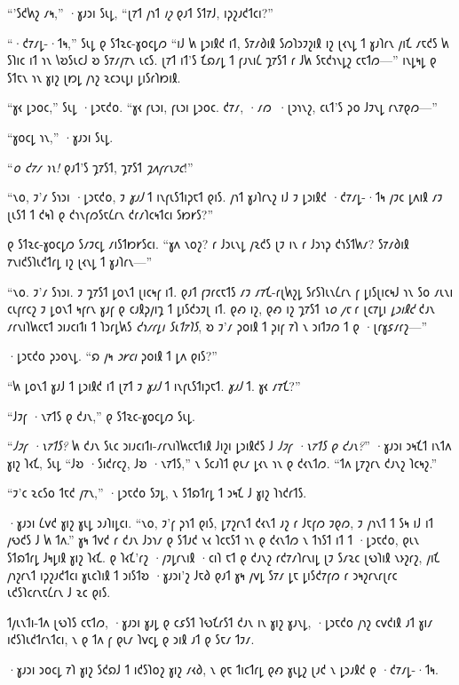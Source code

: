 “'𐑕𐑒𐑿𐑟 𐑥𐑰,” ·𐑣𐑨𐑮𐑦 𐑕𐑧𐑛, “𐑚𐑳𐑑 𐑢𐑪𐑑 \emph{𐑦𐑟} 𐑞𐑨𐑑 𐑕𐑑𐑳𐑓, 𐑦𐑜𐑟𐑨𐑒𐑑𐑤𐑦?”

“·𐑒𐑳𐑥𐑛-·𐑑𐑰,” 𐑕𐑧𐑛 𐑞 𐑕𐑑𐑷𐑤-𐑣𐑴𐑤𐑛𐑼 “𐑦𐑓 𐑿 𐑛𐑮𐑦𐑙𐑒 𐑦𐑑, 𐑕𐑳𐑥𐑔𐑦𐑙 𐑕𐑼𐑐𐑮𐑲𐑟𐑦𐑙 𐑦𐑟 𐑚𐑬𐑯𐑛 𐑑 𐑣𐑨𐑐𐑩𐑯 𐑢𐑦𐑗 𐑥𐑱𐑒𐑕 𐑿 𐑕𐑐𐑦𐑤 𐑦𐑑 𐑪𐑯 𐑘𐑹𐑕𐑧𐑤𐑓 𐑹 𐑕𐑳𐑥𐑢𐑳𐑯 𐑧𐑤𐑕. 𐑚𐑳𐑑 𐑦𐑑'𐑕 𐑗𐑸𐑥𐑛 𐑑 𐑝𐑨𐑯𐑦𐑖 𐑡𐑳𐑕𐑑 𐑩 𐑓𐑿 𐑕𐑱𐑒𐑪𐑯𐑛𐑟 𐑤𐑱𐑑𐑼—” 𐑦𐑯𐑛𐑰𐑛 𐑞 𐑕𐑑𐑱𐑯 𐑪𐑯 𐑣𐑦𐑟 𐑚𐑽𐑛 𐑢𐑪𐑟 𐑷𐑤𐑮𐑧𐑛𐑦 𐑛𐑦𐑕𐑩𐑐𐑽𐑦𐑙.

“𐑣𐑬 𐑛𐑮𐑴𐑤,” 𐑕𐑧𐑛 ·𐑛𐑮𐑱𐑒𐑴. “𐑣𐑬 𐑝𐑧𐑮𐑦, 𐑝𐑧𐑮𐑦 𐑛𐑮𐑴𐑤. 𐑒𐑳𐑥, ·𐑥𐑼~·𐑚𐑮𐑪𐑯𐑟, 𐑤𐑧𐑑'𐑕 𐑜𐑴 𐑓𐑲𐑯𐑛 𐑩𐑯𐑳𐑞𐑼—”

“𐑣𐑴𐑤𐑛 𐑪𐑯,” ·𐑣𐑨𐑮𐑦 𐑕𐑧𐑛.

“\emph{𐑴 𐑒𐑳𐑥 𐑪𐑯!} 𐑞𐑨𐑑'𐑕 𐑡𐑳𐑕𐑑, 𐑡𐑳𐑕𐑑 \emph{𐑡𐑵𐑝𐑩𐑯𐑲𐑤}!”

“𐑯𐑴, 𐑲'𐑥 𐑕𐑪𐑮𐑦 ·𐑛𐑮𐑱𐑒𐑴, 𐑲 \emph{𐑣𐑨𐑓} 𐑑 𐑦𐑯𐑝𐑧𐑕𐑑𐑦𐑜𐑱𐑑 𐑞𐑦𐑕. 𐑢𐑪𐑑 𐑣𐑨𐑐𐑩𐑯𐑟 𐑦𐑓 𐑲 𐑛𐑮𐑦𐑙𐑒 ·𐑒𐑳𐑥𐑛-·𐑑𐑰 𐑢𐑲𐑤 𐑛𐑵𐑦𐑙 𐑥𐑲 𐑚𐑧𐑕𐑑 𐑑 𐑒𐑰𐑐 𐑞 𐑒𐑪𐑯𐑝𐑼𐑕𐑱𐑖𐑩𐑯 𐑒𐑩𐑥𐑐𐑤𐑰𐑑𐑤𐑦 𐑕𐑽𐑾𐑕?”

𐑞 𐑕𐑑𐑷𐑤-𐑣𐑴𐑤𐑛𐑼 𐑕𐑥𐑲𐑤𐑛 𐑥𐑦𐑕𐑑𐑽𐑾𐑕𐑤𐑦. “𐑣𐑵 𐑯𐑴𐑟? 𐑩 𐑓𐑮𐑧𐑯𐑛 𐑢𐑷𐑒𐑕 𐑚𐑲 𐑦𐑯 𐑩 𐑓𐑮𐑪𐑜 𐑒𐑪𐑕𐑑𐑿𐑥? 𐑕𐑳𐑥𐑔𐑦𐑙 𐑳𐑯𐑦𐑒𐑕𐑐𐑧𐑒𐑑𐑩𐑛 𐑦𐑟 𐑚𐑬𐑯𐑛 𐑑 𐑣𐑨𐑐𐑩𐑯—”

“𐑯𐑴. 𐑲'𐑥 𐑕𐑪𐑮𐑦. 𐑲 𐑡𐑳𐑕𐑑 𐑛𐑴𐑯𐑑 𐑚𐑦𐑤𐑰𐑝 𐑦𐑑. 𐑞𐑨𐑑 𐑝𐑲𐑩𐑤𐑱𐑑𐑕 𐑥𐑲 𐑥𐑳𐑗-𐑩𐑚𐑿𐑟𐑛 𐑕𐑩𐑕𐑐𐑧𐑯𐑖𐑩𐑯 𐑝 𐑛𐑦𐑕𐑚𐑦𐑤𐑰𐑓 𐑪𐑯 𐑕𐑴 𐑥𐑧𐑯𐑦 𐑤𐑧𐑝𐑩𐑤𐑟 𐑲 𐑛𐑴𐑯𐑑 𐑰𐑝𐑩𐑯 𐑣𐑨𐑝 𐑞 𐑤𐑨𐑙𐑜𐑢𐑦𐑡 𐑑 𐑛𐑦𐑕𐑒𐑮𐑲𐑚 𐑦𐑑. 𐑞𐑺 𐑦𐑟, 𐑞𐑺 𐑦𐑟 𐑡𐑳𐑕𐑑 \emph{𐑯𐑴 𐑢𐑱} 𐑩 𐑚𐑤𐑳𐑛𐑦 \emph{𐑛𐑮𐑦𐑙𐑒} 𐑒𐑨𐑯 𐑥𐑩𐑯𐑦𐑐𐑿𐑤𐑱𐑑 𐑮𐑦𐑨𐑤𐑦𐑑𐑦 𐑑 𐑐𐑮𐑩𐑛𐑿𐑕 \emph{𐑒𐑪𐑥𐑩𐑛𐑦 𐑕𐑧𐑑𐑳𐑐𐑕}, 𐑹 𐑲'𐑥 𐑜𐑴𐑦𐑙 𐑑 𐑜𐑦𐑝 𐑳𐑐 𐑯 𐑮𐑦𐑑𐑲𐑼 𐑑 𐑞 ·𐑚𐑩𐑣𐑭𐑥𐑩𐑟—”

·𐑛𐑮𐑱𐑒𐑴 𐑜𐑮𐑴𐑯𐑛. “𐑸 𐑢𐑰 \emph{𐑮𐑾𐑤𐑦} 𐑜𐑴𐑦𐑙 𐑑 𐑛𐑵 𐑞𐑦𐑕?”

“𐑿 𐑛𐑴𐑯𐑑 𐑣𐑨𐑓 𐑑 𐑛𐑮𐑦𐑙𐑒 𐑦𐑑 𐑚𐑳𐑑 𐑲 \emph{𐑣𐑨𐑓} 𐑑 𐑦𐑯𐑝𐑧𐑕𐑑𐑦𐑜𐑱𐑑. \emph{𐑣𐑨𐑓} 𐑑. 𐑣𐑬 𐑥𐑳𐑗?”

“𐑓𐑲𐑝 ·𐑯𐑳𐑑𐑕 𐑞 𐑒𐑨𐑯,” 𐑞 𐑕𐑑𐑷𐑤-𐑣𐑴𐑤𐑛𐑼 𐑕𐑧𐑛.

“\emph{𐑓𐑲𐑝 ·𐑯𐑳𐑑𐑕?} 𐑿 𐑒𐑨𐑯 𐑕𐑧𐑤 𐑮𐑦𐑨𐑤𐑦𐑑𐑦-𐑥𐑩𐑯𐑦𐑐𐑿𐑤𐑱𐑑𐑦𐑙 𐑓𐑦𐑟𐑦 𐑛𐑮𐑦𐑙𐑒𐑕 𐑓 \emph{𐑓𐑲𐑝 ·𐑯𐑳𐑑𐑕 𐑞 𐑒𐑨𐑯?}” ·𐑣𐑨𐑮𐑦 𐑮𐑰𐑗𐑑 𐑦𐑯𐑑𐑵 𐑣𐑦𐑟 𐑐𐑬𐑗, 𐑕𐑧𐑛 “𐑓𐑹 ·𐑕𐑦𐑒𐑩𐑤𐑟, 𐑓𐑹 ·𐑯𐑳𐑑𐑕,” 𐑯 𐑕𐑤𐑨𐑐𐑑 𐑞𐑧𐑥 𐑛𐑬𐑯 𐑪𐑯 𐑞 𐑒𐑬𐑯𐑑𐑼. “𐑑𐑵 𐑛𐑳𐑟𐑩𐑯 𐑒𐑨𐑯𐑟 𐑐𐑤𐑰𐑟.”

“𐑲'𐑤 𐑷𐑤𐑕𐑴 𐑑𐑱𐑒 𐑢𐑳𐑯,” ·𐑛𐑮𐑱𐑒𐑴 𐑕𐑲𐑛, 𐑯 𐑕𐑑𐑸𐑑𐑩𐑛 𐑑 𐑮𐑰𐑗 𐑓 𐑣𐑦𐑟 𐑐𐑪𐑒𐑩𐑑𐑕.

·𐑣𐑨𐑮𐑦 𐑖𐑫𐑒 𐑣𐑦𐑟 𐑣𐑧𐑛 𐑮𐑨𐑐𐑦𐑛𐑤𐑦. “𐑯𐑴, 𐑲'𐑝 𐑜𐑪𐑑 𐑞𐑦𐑕, 𐑛𐑳𐑟𐑩𐑯𐑑 𐑒𐑬𐑯𐑑 𐑨𐑟 𐑩 𐑓𐑱𐑝𐑼 𐑲𐑞𐑼, 𐑲 𐑢𐑪𐑯𐑑 𐑑 𐑕𐑰 𐑦𐑓 𐑦𐑑 𐑢𐑻𐑒𐑕 𐑓 𐑿 𐑑𐑵.” 𐑣𐑰 𐑑𐑫𐑒 𐑩 𐑒𐑨𐑯 𐑓𐑮𐑪𐑥 𐑞 𐑕𐑑𐑨𐑒 𐑯𐑬 𐑐𐑤𐑱𐑕𐑑 𐑪𐑯 𐑞 𐑒𐑬𐑯𐑑𐑼 𐑯 𐑑𐑪𐑕𐑑 𐑦𐑑 𐑑 ·𐑛𐑮𐑱𐑒𐑴, 𐑞𐑧𐑯 𐑕𐑑𐑸𐑑𐑩𐑛 𐑓𐑰𐑛𐑦𐑙 𐑣𐑦𐑟 𐑐𐑬𐑗. 𐑞 𐑐𐑬𐑗'𐑩𐑟 ·𐑢𐑲𐑛𐑩𐑯𐑦𐑙 ·𐑤𐑦𐑐 𐑱𐑑 𐑞 𐑒𐑨𐑯𐑟 𐑩𐑒𐑳𐑥𐑐𐑩𐑯𐑦𐑛 𐑚𐑲 𐑕𐑥𐑷𐑤 𐑚𐑻𐑐𐑦𐑙 𐑯𐑶𐑟𐑩𐑟, 𐑢𐑦𐑗 𐑢𐑪𐑟𐑩𐑯𐑑 𐑦𐑜𐑟𐑨𐑒𐑑𐑤𐑦 𐑣𐑧𐑤𐑐𐑦𐑙 𐑑 𐑮𐑦𐑕𐑑𐑹 ·𐑣𐑨𐑮𐑦'𐑟 𐑓𐑱𐑔 𐑞𐑨𐑑 𐑣𐑰 𐑢𐑫𐑛 𐑕𐑳𐑥 𐑛𐑱 𐑛𐑦𐑕𐑒𐑳𐑝𐑼 𐑩 𐑮𐑰𐑟𐑩𐑯𐑩𐑚𐑩𐑤 𐑧𐑒𐑕𐑐𐑤𐑩𐑯𐑱𐑖𐑩𐑯 𐑓 𐑷𐑤 𐑞𐑦𐑕.

𐑑𐑢𐑧𐑯𐑑𐑦-𐑑𐑵 𐑚𐑻𐑐𐑕 𐑤𐑱𐑑𐑼, ·𐑣𐑨𐑮𐑦 𐑣𐑨𐑛 𐑞 𐑤𐑭𐑕𐑑 𐑐𐑻𐑗𐑩𐑕𐑑 𐑒𐑨𐑯 𐑦𐑯 𐑣𐑦𐑟 𐑣𐑨𐑯𐑛, ·𐑛𐑮𐑱𐑒𐑴 𐑢𐑪𐑟 𐑤𐑫𐑒𐑦𐑙 𐑨𐑑 𐑣𐑦𐑥 𐑦𐑒𐑕𐑐𐑧𐑒𐑑𐑩𐑯𐑑𐑤𐑦, 𐑯 𐑞 𐑑𐑵 𐑝 𐑞𐑧𐑥 𐑐𐑫𐑤𐑛 𐑞 𐑮𐑦𐑙 𐑨𐑑 𐑞 𐑕𐑱𐑥 𐑑𐑲𐑥.

·𐑣𐑨𐑮𐑦 𐑮𐑴𐑤𐑛 𐑳𐑐 𐑣𐑦𐑟 𐑕𐑒𐑸𐑓 𐑑 𐑦𐑒𐑕𐑐𐑴𐑟 𐑣𐑦𐑟 𐑥𐑬𐑔, 𐑯 𐑞𐑱 𐑑𐑦𐑤𐑑𐑩𐑛 𐑞𐑺 𐑣𐑧𐑛𐑟 𐑚𐑨𐑒 𐑯 𐑛𐑮𐑨𐑙𐑒 𐑞 ·𐑒𐑳𐑥𐑛-·𐑑𐑰.

